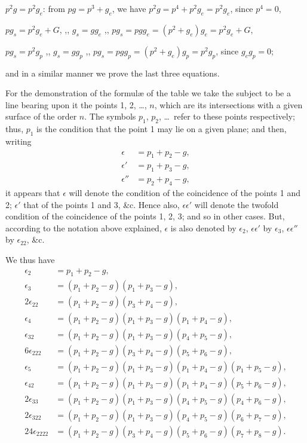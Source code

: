 \documentclass[11pt,a4paper,english]{article}
\theoremstyle{plain}
\begin{document}
$p^2g = p^2g_e$: from $pg = p^3 + g_e$, we have $p^2g = p^4 + p^2g_e = p^2g_e$, since $p^4 = 0$,

$pg_s = p^2g_e + G$, ,, \hspace{3em} $g_s = gg_e$ \hspace{3em} ,, \hspace{3em} $pg_s = pgg_e = (p^2 + g_e)g_e = p^2g_e + G$,

$pg_s = p^2g_p$ \hspace{1.5em} ,, \hspace{3em} $g_s = gg_p$ \hspace{3em} ,, \hspace{3em} $pg_s = pgg_p = (p^2 + g_e)g_p = p^2g_p$, since $g_eg_p = 0$;

and in a similar manner we prove the last three equations.

For the demonstration of the formul\ae{} of the table we take the subject to be a line bearing upon it the points 1, 2, \ldots, $n$, which are its intersections with a given surface of the order $n$. The symbols $p_1$, $p_2$, \ldots\ refer to these points respectively; thus, $p_1$ is the condition that the point 1 may lie on a given plane; and then, writing
\begin{align*}
\epsilon &= p_1 + p_2 - g, \\
\epsilon' &= p_1 + p_3 - g, \\
\epsilon'' &= p_2 + p_4 - g,
\end{align*}
it appears that $\epsilon$ will denote the condition of the coincidence of the points 1 and 2; $\epsilon'$ that of the points 1 and 3, \&c. Hence also, $\epsilon\epsilon'$ will denote the twofold condition of the coincidence of the points 1, 2, 3; and so in other cases. But, according to the notation above explained, $\epsilon$ is also denoted by $\epsilon_2$, $\epsilon\epsilon'$ by $\epsilon_3$, $\epsilon\epsilon''$ by $\epsilon_{22}$, \&c.

We thus have
\begin{align*}
\epsilon_2 &= p_1 + p_2 - g, \\
\epsilon_3 &= (p_1 + p_2 - g)(p_1 + p_3 - g), \\
2\epsilon_{22} &= (p_1 + p_2 - g)(p_3 + p_4 - g), \\
\epsilon_4 &= (p_1 + p_2 - g)(p_1 + p_3 - g)(p_1 + p_4 - g), \\
\epsilon_{32} &= (p_1 + p_2 - g)(p_1 + p_3 - g)(p_4 + p_5 - g), \\
6\epsilon_{222} &= (p_1 + p_2 - g)(p_3 + p_4 - g)(p_5 + p_6 - g), \\
\epsilon_5 &= (p_1 + p_2 - g)(p_1 + p_3 - g)(p_1 + p_4 - g)(p_1 + p_5 - g), \\
\epsilon_{42} &= (p_1 + p_2 - g)(p_1 + p_3 - g)(p_1 + p_4 - g)(p_5 + p_6 - g), \\
2\epsilon_{33} &= (p_1 + p_2 - g)(p_1 + p_3 - g)(p_4 + p_5 - g)(p_4 + p_6 - g), \\
2\epsilon_{322} &= (p_1 + p_2 - g)(p_1 + p_3 - g)(p_4 + p_5 - g)(p_6 + p_7 - g), \\
24\epsilon_{2222} &= (p_1 + p_2 - g)(p_3 + p_4 - g)(p_5 + p_6 - g)(p_7 + p_8 - g).
\end{align*}
\end{document}
